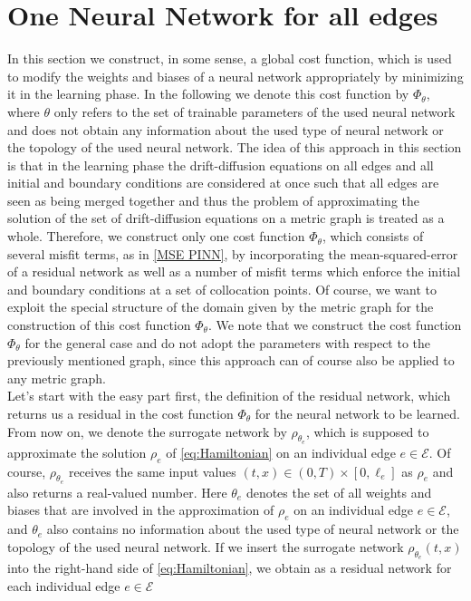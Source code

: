\section{One Neural Network for all edges}
\label{ch3:sec1}

In this section we construct, in some sense, a global cost function, which is used to modify the weights and biases of a neural network appropriately by minimizing it in the learning phase. In the following we denote this cost function by $\Phi_\theta$, where $\theta$ only refers to the set of trainable parameters of the used neural network and does not obtain any information about the used type of neural network or the topology of the used neural network. The idea of this approach in this section is that in the learning phase the drift-diffusion equations on all edges and all initial and boundary conditions are considered at once such that all edges are seen as being merged together and thus the problem of approximating the solution of the set of drift-diffusion equations on a metric graph is treated as a whole. Therefore, we construct only one cost function $\Phi_\theta$, which consists of several misfit terms, as in \cref{MSE PINN}, by incorporating the mean-squared-error of a residual network as well as a number of misfit terms which enforce the initial and boundary conditions at a set of collocation points. Of course, we want to exploit the special structure of the domain given by the metric graph for the construction of this cost function $\Phi_\theta$. We note that we construct the cost function $\Phi_\theta$ for the general case and do not adopt the parameters with respect to the previously mentioned graph, since this approach can of course also be applied to any metric graph. \\
Let's start with the easy part first, the definition of the residual network, which returns us a residual in the cost function $\Phi_\theta$ for the neural network to be learned. From now on, we denote the surrogate network by $\rho_{\theta_e}$, which is supposed to approximate the solution $\rho_e$ of \cref{eq:Hamiltonian} on an individual edge $e \in \mathcal{E}$. Of course, $\rho_{\theta_e}$ receives the same input values $ \left( t, x \right) \in  \left( 0, T \right) \times [0, \ell_e]$ as $\rho_e$ and also returns a real-valued number. Here $\theta_e$ denotes the set of all weights and biases that are involved in the approximation of $\rho_e$ on an individual edge $e \in \mathcal{E}$, and $\theta_e$ also contains no information about the used type of neural network or the topology of the used neural network. If we insert the surrogate network $\rho_{\theta_e} \left( t,x \right)$ into the right-hand side of \cref{eq:Hamiltonian}, we obtain as a residual network for each individual edge $e \in \mathcal{E}$

